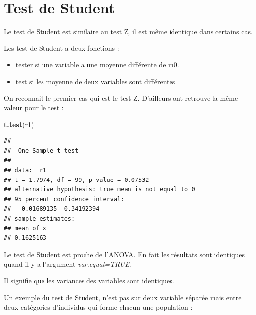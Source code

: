 \documentclass[
]{book}
\newenvironment{Shaded}{\begin{snugshade}}{\end{snugshade}}
\newcommand{\AttributeTok}[1]{\textcolor[rgb]{0.13,0.29,0.53}{#1}}
\newcommand{\FunctionTok}[1]{\textcolor[rgb]{0.13,0.29,0.53}{\textbf{#1}}}
\newcommand{\NormalTok}[1]{#1}
\newcommand{\SpecialCharTok}[1]{\textcolor[rgb]{0.81,0.36,0.00}{\textbf{#1}}}
\newcommand{\StringTok}[1]{\textcolor[rgb]{0.31,0.60,0.02}{#1}}
\begin{document}
\hypertarget{test-de-student}{%
\section{Test de Student}\label{test-de-student}}

Le test de Student est similaire au test Z, il est même identique dans certains
cas.

Les test de Student a deux fonctions :

\begin{itemize}
\item
  tester si une variable a une moyenne différente de m0.
\item
  test si les moyenne de deux variables sont différentes
\end{itemize}

On reconnait le premier cas qui est le test Z. D'ailleurs ont retrouve la même
valeur pour le test :

\begin{Shaded}
\begin{Highlighting}[]
\FunctionTok{t.test}\NormalTok{(r1)}
\end{Highlighting}
\end{Shaded}

\begin{verbatim}
## 
##  One Sample t-test
## 
## data:  r1
## t = 1.7974, df = 99, p-value = 0.07532
## alternative hypothesis: true mean is not equal to 0
## 95 percent confidence interval:
##  -0.01689135  0.34192394
## sample estimates:
## mean of x 
## 0.1625163
\end{verbatim}

Le test de Student est proche de l'ANOVA. En fait les résultats sont identiques
quand il y a l'argument \emph{var.equal=TRUE}.

Il signifie que les variances des variables sont identiques.

Un exemple du test de Student, n'est pas sur deux variable séparée mais entre
deux catégories d'individus qui forme chacun une population :

\begin{Shaded}
\end{Shaded}
\end{document}
